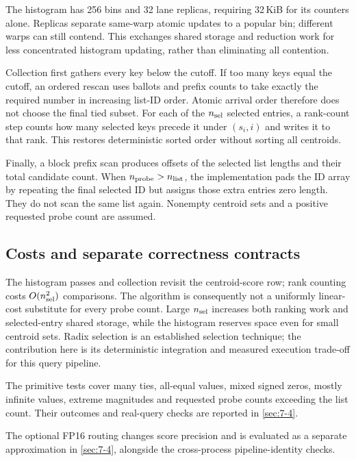 The histogram has 256 bins and 32 lane replicas, requiring 32\,KiB for
its counters alone. Replicas separate same-warp atomic updates to a
popular bin; different warps can still contend. This exchanges shared
storage and reduction work for less concentrated histogram updating,
rather than eliminating all contention.

Collection first gathers every key below the cutoff. If too many keys
equal the cutoff, an ordered rescan uses ballots and prefix counts to
take exactly the required number in increasing list-ID order. Atomic
arrival order therefore does not choose the final tied subset.
For each of the $n_{\rm sel}$ selected entries, a rank-count step counts how many
selected keys precede it under $(s_i,i)$ and writes it to that rank.
This restores deterministic sorted order without sorting all centroids.

Finally, a block prefix scan produces offsets of the selected list
lengths and their total candidate count. When $n_{\rm probe}>n_{\rm list}$,
the implementation pads the ID array by repeating the final selected ID
but assigns those extra entries zero length. They do not scan the same
list again. Nonempty centroid sets and a positive requested probe count
are assumed.

\subsection{Costs and separate correctness contracts}

The histogram passes and collection revisit the centroid-score row;
rank counting costs $O(n_{\rm sel}^2)$ comparisons. The algorithm is consequently
not a uniformly linear-cost substitute for every probe count. Large
$n_{\rm sel}$ increases both ranking work and selected-entry shared storage,
while the histogram reserves space even for small centroid sets.
Radix selection is an established selection technique; the contribution
here is its deterministic integration and measured execution trade-off
for this query pipeline.



The primitive tests cover many ties, all-equal values, mixed signed
zeros, mostly infinite values, extreme magnitudes and requested probe
counts exceeding the list count. Their outcomes and real-query checks
are reported in \cref{sec:7-4}.


The optional FP16 routing changes score precision and is evaluated as
a separate approximation in \cref{sec:7-4}, alongside the cross-process
pipeline-identity checks.

